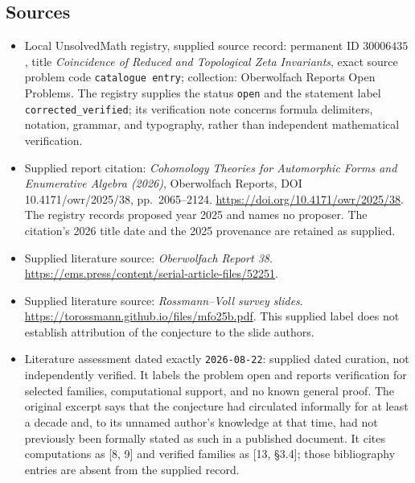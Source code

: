 \documentclass[11pt]{article}
\begin{document}
\subsection{Sources}
\begin{itemize}
\item Local UnsolvedMath registry, supplied source record: permanent ID \(30006435\), title \emph{Coincidence of Reduced and Topological Zeta Invariants}, exact source problem code \texttt{catalogue entry}; collection: Oberwolfach Reports Open Problems. The registry supplies the status \texttt{open} and the statement label \texttt{corrected\_verified}; its verification note concerns formula delimiters, notation, grammar, and typography, rather than independent mathematical verification.
\item Supplied report citation: \emph{Cohomology Theories for Automorphic Forms and Enumerative Algebra (2026)}, Oberwolfach Reports, DOI 10.4171/owr/2025/38, pp.\ 2065--2124. \url{https://doi.org/10.4171/owr/2025/38}. The registry records proposed year 2025 and names no proposer. The citation's 2026 title date and the 2025 provenance are retained as supplied.
\item Supplied literature source: \emph{Oberwolfach Report 38}. \url{https://ems.press/content/serial-article-files/52251}.
\item Supplied literature source: \emph{Rossmann--Voll survey slides}. \url{https://torossmann.github.io/files/mfo25b.pdf}. This supplied label does not establish attribution of the conjecture to the slide authors.
\item Literature assessment dated exactly \texttt{2026-08-22}: supplied dated curation, not independently verified. It labels the problem open and reports verification for selected families, computational support, and no known general proof. The original excerpt says that the conjecture had circulated informally for at least a decade and, to its unnamed author's knowledge at that time, had not previously been formally stated as such in a published document. It cites computations as [8, 9] and verified families as [13, \S3.4]; those bibliography entries are absent from the supplied record.
\end{itemize}
\end{document}
